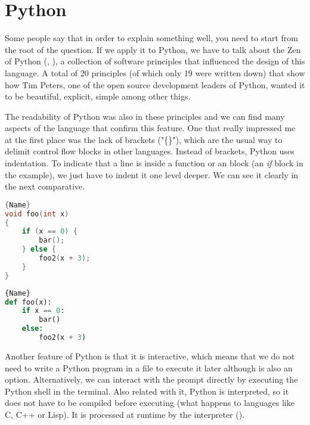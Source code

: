 \section{Python}
\label{sec:python}
Some people say that in order to explain something well, you need to start from the root of the question. If we apply it to Python, we have to talk about the Zen of Python (\cite{origin_zen_of_python}, \cite{zen_of_python}), a collection of software principles that influenced the design of this language. A total of 20 principles (of which only 19 were written down) that show how Tim Peters, one of the open source development leaders of Python, wanted it to be beautiful, explicit, simple among other thigs.

The readability of Python was also in these principles and we can find many aspects of the language that confirm this feature. One that really impressed me at the first place was the lack of brackets ("\{\}"), which are the usual way to delimit control flow blocks in other languages. Instead of brackets, Python uses indentation. To indicate that a line is inside a function or an block (an \textit{if} block in the example), we just have to indent it one level deeper. We can see it clearly in the next comparative.

\noindent\begin{minipage}[t]{.45\textwidth}
\begin{lstlisting}[caption=C code,frame=tlrb, language=C]{Name}
void foo(int x)
{
    if (x == 0) {
        bar();
    } else {
        foo2(x + 3);
    }
}
\end{lstlisting}
\end{minipage}\hfill
\begin{minipage}[t]{.45\textwidth}
\begin{lstlisting}[caption=Python code,frame=tlrb, language=Python]{Name}
def foo(x):
    if x == 0:
        bar()
    else:
        foo2(x + 3)
\end{lstlisting}
\end{minipage}

\vspace{0.5cm}

Another feature of Python is that it is interactive, which means that we do not need to write a Python program in a file to execute it later although is also an option. Alternatively, we can interact with the prompt directly by executing the Python shell in the terminal. Also related with it, Python is interpreted, so it does not have to be compiled before executing (what happens to languages like C, C++ or Lisp). It is processed at runtime by the interpreter (\cite{python_overview}). 

